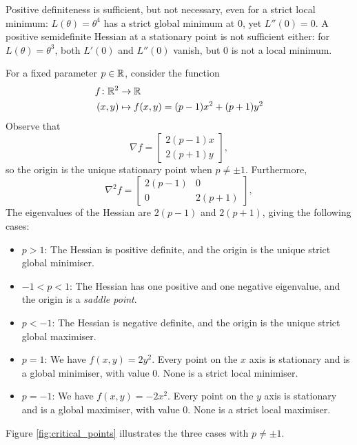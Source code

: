 \begin{remark}
Positive definiteness is sufficient, but not necessary, even for a strict local minimum: $L(\theta)=\theta^4$ has a strict global minimum at $0$, yet $L''(0)=0$. A positive semidefinite Hessian at a stationary point is not sufficient either: for $L(\theta)=\theta^3$, both $L'(0)$ and $L''(0)$ vanish, but $0$ is not a local minimum.
\end{remark}

\begin{example}

For a fixed parameter $p\in\mathbb{R}$, consider the function
\begin{align}
  f \colon \mathbb{R}^2 &\to \mathbb{R}\nonumber\\
  (x,y) &\mapsto f(x,y)=(p-1)x^2 + (p+1)y^2
   \label{eq:example_fn_stationary_points} 
\end{align}
Observe that
\begin{equation}
	\nabla f = \begin{bmatrix}   2(p-1)x \\ 2(p+1)y   \end{bmatrix},
	\label{eq:nabla_example_fn_stationary_points}
\end{equation}
so the origin is the unique stationary point when $p\neq\pm1$. Furthermore, 
\begin{equation}
	\nabla^2 f = \begin{bmatrix}   2(p-1) & 0 \\ 0 & 2(p+1)   \end{bmatrix},
	\label{eq:nabla2_example_fn_stationary_points}
\end{equation}
The eigenvalues of the Hessian are $2(p-1)$ and $2(p+1)$, giving the following cases:

\begin{itemize}
    \item $p>1$: The Hessian is positive definite, and the origin is the unique strict global minimiser.
    \item $-1<p<1$: The Hessian has one positive and one negative eigenvalue, and the origin is a \emph{saddle point}.
    \item $p<-1$: The Hessian is negative definite, and the origin is the unique strict global maximiser.
    \item $p=1$: We have $f(x,y)=2y^2$. Every point on the $x$ axis is stationary and is a global minimiser, with value $0$. None is a strict local minimiser.
    \item $p=-1$: We have $f(x,y)=-2x^2$. Every point on the $y$ axis is stationary and is a global maximiser, with value $0$. None is a strict local maximiser.
\end{itemize}
Figure \ref{fig:critical_points} illustrates the three cases with $p\neq\pm1$.


\end{example}
